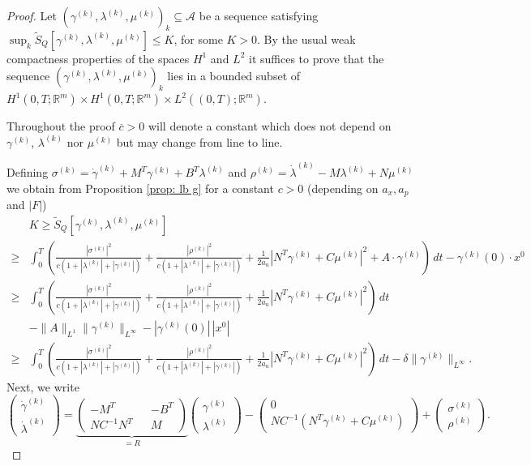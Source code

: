 \documentclass[10pt,a4paper]{amsart}
\newcommand{\R}{\mathbb R}
\begin{document}
\begin{proof}
Let $(\gamma^{(k)},\lambda^{(k)}, \mu^{(k)})_k \subseteq \mathcal{A}$ be a sequence satisfying $\sup_k \tilde{S}_Q[\gamma^{(k)},\lambda^{(k)}, \mu^{(k)}] \leq K$, for some $K>0$.
By the usual weak compactness properties of the spaces $H^1$ and $L^2$ it suffices to prove that the sequence $(\gamma^{(k)},\lambda^{(k)}, \mu^{(k)})_k$ lies in a bounded subset of $H^1(0,T; \R^m) \times H^1(0,T; \R^m) \times L^2((0,T); \R^m)$.

Throughout the proof $\overline{c}>0$ will denote a constant which does not depend on $\gamma^{(k)}$, $\lambda^{(k)}$ nor $\mu^{(k)}$ but may change from line to line.

Defining $\sigma^{(k)} = \dot{\gamma}^{(k)} + M^T\gamma^{(k)} + B^T \lambda^{(k)}$ and $\rho^{(k)} = \dot{\lambda}^{(k)} - M \lambda^{(k)}  + N \mu^{(k)}$ we obtain from Proposition \ref{prop: lb g} for a constant $c>0$ (depending on $a_x, a_p$ and $|F|$)
\begin{align}
&K \geq \tilde{S}_Q[\gamma^{(k)},\lambda^{(k)}, \mu^{(k)}]  \label{eq: est coer dual} \\
\geq &\int_0^T \left( \frac{|\sigma^{(k)}|^2}{c(1 + |\lambda^{(k)}| + |\gamma^{(k)}|)} + \frac{|\rho^{(k)} |^2}{c(1 + |\lambda^{(k)}| + |\gamma^{(k)}|)} + \frac1{2a_u} |N^T\gamma^{(k)} + C \mu^{(k)}|^2 + A\cdot \gamma^{(k)} \right)  \, dt - \gamma^{(k)}(0)\cdot x^0 \nonumber \\
\geq &\int_0^T \left( \frac{|\sigma^{(k)}|^2}{c(1 + |\lambda^{(k)}| +  |\gamma^{(k)}|)} + \frac{|\rho^{(k)} |^2}{c(1 + |\lambda^{(k)}| + |\gamma^{(k)}|)} + \frac1{2a_u} |N^T\gamma^{(k)} + C \mu^{(k)}|^2 \right)  \, dt \nonumber  \\
& - \|A\|_{L^1} \| \gamma^{(k)}\|_{L^{\infty}} - |\gamma^{(k)}(0)| \, |x^0| \nonumber \\
\geq &\int_0^T \left( \frac{|\sigma^{(k)}|^2}{c(1 + |\lambda^{(k)}| +  |\gamma^{(k)}|)} + \frac{|\rho^{(k)} |^2}{c(1 + |\lambda^{(k)}| +  |\gamma^{(k)}|)} + \frac1{2a_u} |N^T\gamma^{(k)} + C \mu^{(k)}|^2 \right)  \, dt - \delta \| \gamma^{(k)} \|_{L^{\infty}}. \nonumber
\end{align}
Next, we write
\begin{equation}\label{eq: rep derivative}
\begin{pmatrix}
    \dot{\gamma}^{(k)} \\ \dot{\lambda}^{(k)}
\end{pmatrix} = \underbrace{\begin{pmatrix} -M^T && - B^T \\ N C^{-1}N^T &&  M \end{pmatrix}}_{= R} \begin{pmatrix} \gamma^{(k)} \\ \lambda^{(k)} \end{pmatrix} - \begin{pmatrix} 0 \\ N C^{-1} ( N^T\gamma^{(k)} + C\mu^{(k)}) \end{pmatrix} +  \begin{pmatrix} \sigma^{(k)} \\ \rho^{(k)} \end{pmatrix}.

\end{equation}
\end{proof}
\end{document}
